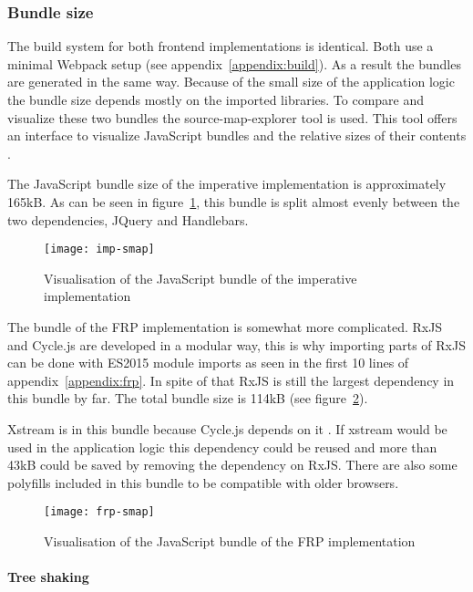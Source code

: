 \subsubsection{Bundle size}

The build system for both frontend implementations is identical. Both use a minimal Webpack setup (see appendix~\ref{appendix:build}). As a result the bundles are generated in the same way. Because of the small size of the application logic the bundle size depends mostly on the imported libraries. To compare and visualize these two bundles the source-map-explorer tool is used. This tool offers an interface to visualize JavaScript bundles and the relative sizes of their contents \cite{sme}.

The JavaScript bundle size of the imperative implementation is approximately 165kB. As can be seen in figure~\ref{figure:imp-smap}, this bundle is split almost evenly between the two dependencies, JQuery and Handlebars.

\begin{figure}[H]
	\centering
	\texttt{[image: imp-smap]}
	\caption{Visualisation of the JavaScript bundle of the imperative implementation}
	\label{figure:imp-smap}
\end{figure}

The bundle of the FRP implementation is somewhat more complicated. RxJS and Cycle.js are developed in a modular way, this is why importing parts of RxJS can be done with ES2015 module imports as seen in the first 10 lines of appendix~\ref{appendix:frp}. In spite of that RxJS is still the largest dependency in this bundle by far. The total bundle size is 114kB (see figure~\ref{figure:frp-smap}).

Xstream is in this bundle because Cycle.js depends on it \cite{cycle}. If xstream would be used in the application logic this dependency could be reused and more than 43kB could be saved by removing the dependency on RxJS. There are also some polyfills included in this bundle to be compatible with older browsers.

\begin{figure}[H]
	\centering
	\texttt{[image: frp-smap]}
	\caption{Visualisation of the JavaScript bundle of the FRP implementation}
	\label{figure:frp-smap}
\end{figure}

\paragraph{Tree shaking}\mbox{}


